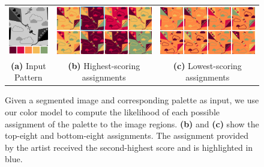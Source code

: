 \begin{figure}[ht]
\begin{tabular}{ccc}
\includegraphics[width=.15\linewidth]{figs/permutationTemplatePalette} & \includegraphics[width=.4\linewidth]{figs/permutationBest8} & \includegraphics[width=.4\linewidth]{figs/permutationWorst8} %
  \\
\textbf{(a)} Input Pattern & \textbf{(b)} Highest-scoring assignments & \textbf{(c)} Lowest-scoring assignments %
\\
\end{tabular}

\caption{Given a segmented image and corresponding palette as input, we use our color model to compute the likelihood of each possible assignment of the palette to the image regions. \textbf{(b)} and \textbf{(c)} show the top-eight and bottom-eight assignments. The assignment provided by the artist received the second-highest score and is highlighted in blue.}
\label{fig:permutation}
\end{figure}


